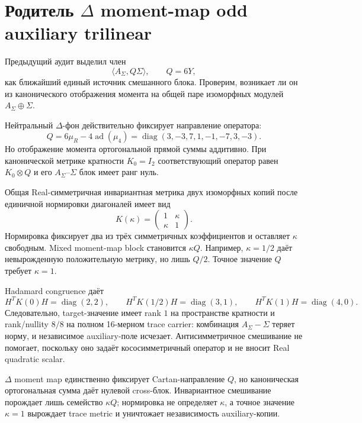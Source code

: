 \chapter{Родитель \texorpdfstring{$\Delta$}{Delta} moment-map odd
auxiliary trilinear}
\label{ch:v10-h15-r2-delta-moment-map-odd-trilinear-parent}

Предыдущий аудит выделил член
\begin{equation}
 \langle A_\Sigma,Q\Sigma\rangle,
 \qquad Q=6Y,
\end{equation}
как ближайший единый источник смешанного блока. Проверим, возникает ли он
из канонического отображения момента на общей паре изоморфных модулей
$A_\Sigma\oplus\Sigma$.

Нейтральный $\Delta$-фон действительно фиксирует направление оператора:
\begin{equation}
 Q=6\mu_R-4\operatorname{ad}(\mu_4)
 =\operatorname{diag}(3,-3,7,1,-1,-7,3,-3).
\end{equation}
Но отображение момента ортогональной прямой суммы аддитивно. При
канонической метрике кратности $K_0=I_2$ соответствующий оператор равен
$K_0\otimes Q$ и его $A_\Sigma$--$\Sigma$ блок имеет ранг нуль.

Общая Real-симметричная инвариантная метрика двух изоморфных копий после
единичной нормировки диагоналей имеет вид
\begin{equation}
 K(\kappa)=
 \begin{pmatrix}1&\kappa\\\kappa&1\end{pmatrix}.
\end{equation}
Нормировка фиксирует два из трёх симметричных коэффициентов и оставляет
$\kappa$ свободным. Mixed moment-map block становится $\kappa Q$.
Например, $\kappa=1/2$ даёт невырожденную положительную метрику, но лишь
$Q/2$. Точное значение $Q$ требует $\kappa=1$.

Hadamard congruence даёт
\begin{equation}
 H^TK(0)H=\operatorname{diag}(2,2),\qquad
 H^TK(1/2)H=\operatorname{diag}(3,1),\qquad
 H^TK(1)H=\operatorname{diag}(4,0).
\end{equation}
Следовательно, target-значение имеет rank $1$ на пространстве кратности и
rank/nullity $8/8$ на полном 16-мерном trace carrier: комбинация
$A_\Sigma-\Sigma$ теряет норму, и независимое auxiliary-поле исчезает.
Антисимметричное смешивание не помогает, поскольку оно задаёт
кососимметричный оператор и не вносит Real quadratic scalar.

\begin{theorem}
$\Delta$ moment map единственно фиксирует Cartan-направление $Q$, но
каноническая ортогональная сумма даёт нулевой cross-блок. Инвариантное
смешивание порождает лишь семейство $\kappa Q$; нормировка не определяет
$\kappa$, а точное значение $\kappa=1$ вырождает trace metric и уничтожает
независимость auxiliary-копии.
\end{theorem}

